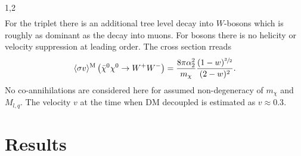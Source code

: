 \documentclass[11pt,a4paper,twoside]{article}
\numberwithin{equation}{section}
\begin{document}
\begin{spacing}{1,2}
\begin{align}
\end{align}
For the triplet there is an additional tree level decay into $W$-bosons which is roughly as dominant as the decay into muons. For bosons there is
no helicity or velocity suppression at leading order. The cross section rreads\cite{1401.6212}
\begin{align}
 \langle \sigma v \rangle^\text{M} \left(\bar \chi^0 \chi^0 \rightarrow W^+W^-\right) = \frac{8\pi \alpha_2^2}{m_\chi} \frac{(1-w)^{\sfrac32}}{(2-w)^2}.
\end{align}
No co-annihilations are considered here for assumed non-degeneracy of $m_\chi$ and $M_{l,q}$. The velocity $v$ at the time when DM decoupled is
estimated as $v\approx 0.3$. 




\section{Results}




\end{spacing}
\end{document}
